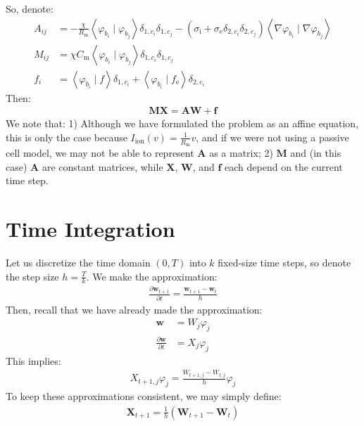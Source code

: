 \documentclass{article}
\newcommand{\bvec}[1]{\boldsymbol{#1}}
\newcommand{\bmat}[1]{\boldsymbol{#1}}
\begin{document}
\noindent So, denote:
\begin{align*}
    A_{ij} & = -\frac{\chi}{R_\text{m}} \left< \varphi_{b_i} \mid \varphi_{b_j} \right> \delta_{1,c_i} \delta_{1,c_j}
        - (\sigma_\text{i} + \sigma_\text{e} \delta_{2,c_i} \delta_{2,c_j}) \left< \nabla \varphi_{b_i} \mid \nabla \varphi_{b_j} \right> \\
    M_{ij} & = \chi C_\text{m} \left< \varphi_{b_i} \mid \varphi_{b_j} \right> \delta_{1,c_i} \delta_{1,c_j} \\
    f_i & = \left< \varphi_{b_i} \mid f \right> \delta_{1,c_i} + \left< \varphi_{b_i} \mid f_\text{e} \right> \delta_{2,c_i}
\end{align*}
\noindent Then:
\begin{align} \label{mateq}
    \bmat{M} \bvec{X} = \bmat{A} \bvec{W} + \bvec{f}
\end{align}
\noindent We note that:
1) Although we have formulated the problem as an affine equation,
this is only the case because $I_\text{ion}(v) = \frac{1}{R_\text{m}} v$,
and if we were not using a passive cell model,
we may not be able to represent $\bmat{A}$ as a matrix;
2) $\bmat{M}$ and (in this case) $\bmat{A}$ are constant matrices,
while $\bvec{X}$, $\bvec{W}$, and $\bvec{f}$ each depend on the current time step.

\newpage

\section{Time Integration}

Let us discretize the time domain $(0, T)$ into $k$ fixed-size time steps,
so denote the step size $h = \frac{T}{k}$.
We make the approximation:
\begin{align*}
    \frac{\partial \bvec{w}_{t + 1}}{\partial t} = \frac{\bvec{w}_{t + 1} - \bvec{w}_t}{h}
\end{align*}
\noindent Then, recall that we have already made the approximation:
\begin{align*}
    \bvec{w} & = W_j \varphi_j \\
    \frac{\partial \bvec{w}}{\partial t} & = X_j \varphi_j
\end{align*}
\noindent This implies:
\begin{align*}
    X_{t + 1,j} \varphi_j = \frac{W_{t + 1,j} - W_{t,j}}{h} \varphi_j
\end{align*}
\noindent To keep these approximations consistent, we may simply define:
\begin{align*}
    \bvec{X}_{t + 1} = \frac{1}{h}(\bvec{W}_{t + 1} - \bvec{W}_t)
\end{align*}
\end{document}
